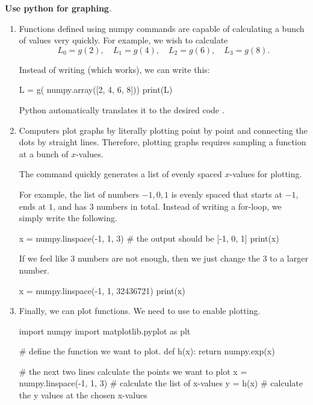 \documentclass[../main.tex]{subfiles}
\begin{document}
\textbf{Use python for graphing}.  

\begin{enumerate}
  \item Functions defined using numpy commands are capable of calculating a bunch of values very quickly.  For example, we wish to calculate
    \[
      L_{0} = g(2), \quad L_{1} = g(4), \quad L_{2} = g(6), \quad L_{3} = g(8).
    \]

    Instead of writing  (which works), we can write this:
    \begin{pythoncode}
L = g( numpy.array([2, 4, 6, 8]))
print(L)
    \end{pythoncode}
    Python automatically translates it to the desired code .

  \item Computers plot graphs by literally plotting point by point and connecting the dots by straight lines.  Therefore, plotting graphs requires sampling a function at a bunch of \(x\)-values. 

    The command  quickly generates a list of evenly spaced \(x\)-values for plotting.

    For example, the list of numbers \(-1, 0, 1\) is evenly spaced that starts at \(-1\), ends at \(1\), and has \(3\) numbers in total.  Instead of writing a for-loop, we simply write the following.
    \begin{pythoncode}
x = numpy.linspace(-1, 1, 3)   # the output should be [-1, 0, 1]
print(x)
    \end{pythoncode}

    If we feel like \(3\) numbers are not enough, then we just change the \(3\) to a larger number.
    \begin{pythoncode}
x = numpy.linspace(-1, 1, 32436721)
print(x)
    \end{pythoncode}

  \item Finally, we can plot functions.   We need to use  to enable plotting. 

    \begin{pythoncode}
import numpy
import matplotlib.pyplot as plt

# define the function we want to plot.
def h(x):
    return numpy.exp(x)

# the next two lines calculate the points we want to plot
x = numpy.linspace(-1, 1, 3)    # calculate the list of x-values
y = h(x)                        # calculate the y values at the chosen x-values


\end{pythoncode}
\end{enumerate}
\end{document}
